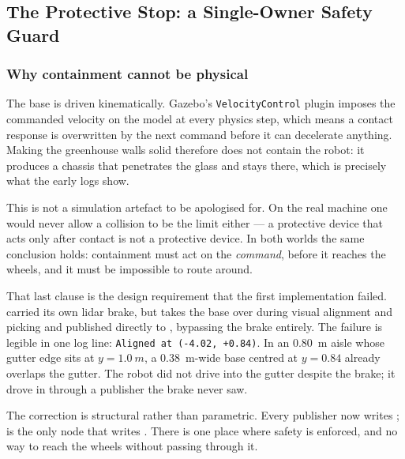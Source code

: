 \subsection{The Protective Stop: a Single-Owner Safety Guard}
\label{sec:safety}

\subsubsection{Why containment cannot be physical}

The base is driven kinematically. Gazebo's \texttt{VelocityControl} plugin
imposes the commanded velocity on the model at every physics step, which
means a contact response is overwritten by the next command before it can
decelerate anything. Making the greenhouse walls solid therefore does not
contain the robot: it produces a chassis that penetrates the glass and stays
there, which is precisely what the early logs show.

This is not a simulation artefact to be apologised for. On the real machine
one would never allow a collision to be the limit either --- a protective
device that acts only after contact is not a protective device. In both
worlds the same conclusion holds: containment must act on the
\emph{command}, before it reaches the wheels, and it must be impossible to
route around.

That last clause is the design requirement that the first implementation
failed.  carried its own lidar brake, but
 takes the base over during visual alignment and
picking and published directly to , bypassing the brake
entirely. The failure is legible in one log line: \texttt{Aligned at
(-4.02, +0.84)}. In an \SI{0.80}{m} aisle whose gutter edge sits at
$y = \SI{1.0}{m}$, a \SI{0.38}{m}-wide base centred at $y = 0.84$ already
overlaps the gutter. The robot did not drive into the gutter despite the
brake; it drove in through a publisher the brake never saw.

The correction is structural rather than parametric. Every publisher now
writes ;  is the only node
that writes . There is one place where safety is
enforced, and no way to reach the wheels without passing through it.

